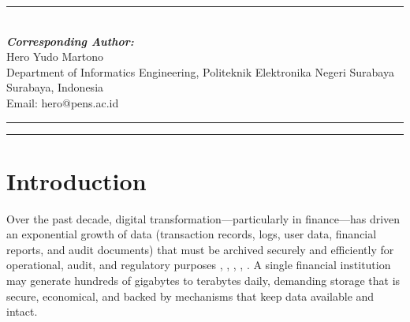 \documentclass{iaesarticle}
\begin{document}
\parbox[t][][s]{0.65\textwidth}{%
\begin{abstract}
\vspace{.3em}
Ransomware threatens the availability and integrity of data in cloud storage, and conventional backups remain vulnerable when the repository is directly reachable from the primary system, while single-algorithm compression is inefficient for heterogeneous file types. This study proposes a cloud backup system that integrates a logical \textit{air-gapped} mechanism with adaptive multi-algorithm \textit{lossless} compression to improve resilience and storage efficiency. The system uses SHA-256 \textit{hash} verification, metadata analysis, and file-structure inspection to distinguish legitimate backup encryption from ransomware-induced modification. Evaluation was performed in a controlled manner using a simulated attack model---without executing real \textit{malware}---on a limited synthetic \textit{dataset} of 43 files of varying types and sizes, under both normal and attacked conditions, and replicated on AWS EC2 (Windows and Linux). For low-entropy text files, compression reduced storage by up to 89.5\% (logs) and 81.1\% (CSV), whereas already-compressed files (JPG, XLSX) approached 0\%, consistent with information theory. The adaptive strategy completed the whole dataset about $21\times$ faster than static Gzip while still saving 43.3\% of storage. The system recovered all 43 affected files without error and, under the controlled conditions, achieved 0\% false positive rate (FPR) and 0\% false negative rate (FNR). Overall, the proposed approach strengthens the security, resilience, and storage efficiency of cloud backup against ransomware.
\end{abstract}
}
\parbox[l]{\textwidth}{%
\rule{0.275\textwidth}{0.5pt} \hspace{0.5cm} \hrulefill
\\
\emph{\textbf{Corresponding Author:}}
\vspace{.5em}\\
Hero Yudo Martono\\
Department of Informatics Engineering, Politeknik Elektronika Negeri Surabaya\\
Surabaya, Indonesia\\
Email: hero@pens.ac.id
}
\vspace{.5em}
\hrule
\vspace{.1em}
\hrule

\section{Introduction}
\label{sec:introduction}
Over the past decade, digital transformation---particularly in finance---has driven an exponential growth of data (transaction records, logs, user data, financial reports, and audit documents) that must be archived securely and efficiently for operational, audit, and regulatory purposes \cite{1}, \cite{2}, \cite{3}, \cite{4}, \cite{5}. A single financial institution may generate hundreds of gigabytes to terabytes daily, demanding storage that is secure, economical, and backed by mechanisms that keep data available and intact.
\end{document}
